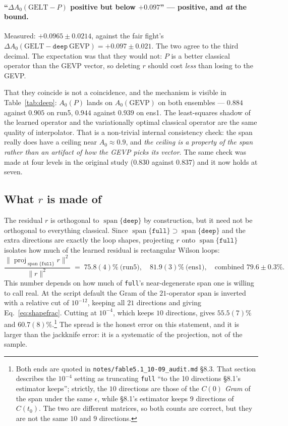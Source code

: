 \documentclass[11pt,a4paper]{article}
\newcommand{\Azero}{A_0}
\newcommand{\dAzero}{\Delta A_0}
\newcommand{\spn}{\operatorname{span}}
\newcommand{\arm}[1]{\texttt{#1}}
\begin{document}
\paragraph{``$\dAzero(\text{GELT}-P)$ positive but below $+0.097$'' --- positive,
and \emph{at} the bound.} Measured: $+0.0965 \pm 0.0214$, against the fair
fight's $\dAzero(\text{GELT} - \arm{deep}\ \text{GEVP}) = +0.097 \pm 0.021$. The
two agree to the third decimal. The expectation was that they would not: $P$ is
a better classical operator than the GEVP vector, so deleting $r$ should cost
\emph{less} than losing to the GEVP.

That they coincide is not a coincidence, and the mechanism is visible in
Table~\ref{tab:deep}: $\Azero(P)$ lands on $\Azero(\text{GEVP})$ on both
ensembles --- $0.884$ against $0.905$ on run5, $0.944$ against $0.939$ on ens1.
The least-squares shadow of the learned operator and the variationally optimal
classical operator are the same quality of interpolator. That is a non-trivial
internal consistency check: the span really does have a ceiling near
$\Azero \approx 0.9$, and \emph{the ceiling is a property of the span rather
than an artifact of how the GEVP picks its vector}. The same check was made at
four levels in the original study ($0.830$ against $0.837$) and it now holds at
seven.

\subsection{What $r$ is made of}
\label{sec:shapespan}

The residual $r$ is orthogonal to $\spn\{\arm{deep}\}$ by construction, but it
need not be orthogonal to everything classical. Since
$\spn\{\arm{full}\} \supset \spn\{\arm{deep}\}$ and the extra directions are
exactly the loop shapes, projecting $r$ onto $\spn\{\arm{full}\}$ isolates how
much of the learned residual is rectangular Wilson loops:
\begin{equation}
  \frac{\|\operatorname{proj}_{\spn\{\arm{full}\}} r\|^2}{\|r\|^2}
  \;=\; 75.8(4)\%\ \text{(run5)},\quad 81.9(3)\%\ \text{(ens1)},
  \quad \text{combined } 79.6 \pm 0.3\%.
  \label{eq:shapefrac}
\end{equation}
This number depends on how much of \arm{full}'s near-degenerate span one is
willing to call real. At the script default the Gram of the $21$-operator span
is inverted with a relative cut of $10^{-12}$, keeping all $21$ directions and
giving Eq.~\eqref{eq:shapefrac}. Cutting at $10^{-4}$, which keeps $10$
directions, gives $55.5(7)\%$ and $60.7(8)\%$.\footnote{Both ends are quoted in
\texttt{notes/fable5.1\_10-09\_audit.md} \S8.3. That section describes the
$10^{-4}$ setting as truncating \arm{full} ``to the 10 directions \S8.1's
estimator keeps''; strictly, the $10$ directions are those of the \emph{$C(0)$
Gram} of the span under the same $\epsilon$, while \S8.1's estimator keeps $9$
directions of $C(t_0)$. The two are different matrices, so both counts are
correct, but they are not the same $10$ and $9$ directions.} The spread is the
honest error on this statement, and it is larger than the jackknife error: it is
a systematic of the projection, not of the sample.
\end{document}
